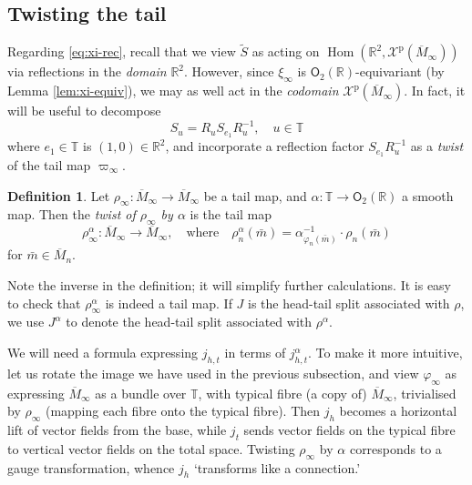 \documentclass{article}
\def\RR{\mathbb{R}}
\def\TT{\mathbb{T}}
\def\XX{\mathscr{X}}
\def\O{\mathsf{O}}
\DeclareMathOperator{\Hom}{\mathrm{Hom}}
\def\p{\mathrm{p}}
\theoremstyle{definition}
\newtheorem{defn}{Definition}
\begin{document}
\subsection{Twisting the tail}
Regarding \eqref{eq:xi-rec}, recall that
we view $\tilde S$ as acting on $\Hom(\RR^2, \XX^\p(\overline M_\infty))$
via reflections in the \emph{domain} $\RR^2$. However, since $\xi_\infty$
is $\O_2(\RR)$-equivariant (by Lemma \ref{lem:xi-equiv}), we may as well
act in the \emph{codomain} $\XX^\p(\overline M_\infty)$. In fact, it will
be useful to decompose
$$ S_u = R_u S_{e_1} R_u^{-1},\quad u \in \TT $$
where $e_1 \in \TT$ is $(1,0) \in \RR^2$, and
incorporate a reflection factor $S_{e_1} R_u^{-1}$ as a \emph{twist}
of the tail map $\varpi_\infty$.
\begin{defn}
Let $\rho_\infty : \overline M_\infty \to \overline M_\infty$ be a tail map,
and $\alpha : \TT \to \O_2(\RR)$ a smooth map. Then the \emph{twist of $\rho_\infty$ by $\alpha$}
is the tail map 
$$\rho^\alpha_\infty : \overline M_\infty \to \overline M_\infty,\quad\textrm{where}\quad
\rho^\alpha_n(\bar m) = \alpha_{\varphi_n(\bar m)}^{-1} \cdot \rho_n(\bar m) $$
for $\bar m \in \overline M_n$.
\end{defn}
Note the inverse in the definition; it will simplify further calculations.
It is easy to check that $\rho^\alpha_\infty$ is indeed a tail map.
If $J$ is the head-tail split associated with $\rho$,
we use $J^\alpha$ to denote the head-tail split
associated with $\rho^\alpha$. 

We will need a formula expressing
$ j_{h,t}$ in terms of $ j^\alpha_{h,t}$.
To make it more intuitive, let us rotate the image we have used in the previous subsection,
and view $\varphi_\infty$ as expressing $\overline M_\infty$ as a bundle over $\TT$,
with typical fibre (a copy of) $\overline M_\infty$, trivialised by $\rho_\infty$ (mapping each fibre
onto the typical fibre). Then $ j_h$ becomes a horizontal lift of vector fields from the base, while $ j_t$
sends vector fields on the typical fibre to vertical vector fields on the total space.
Twisting $\rho_\infty$ by $\alpha$ corresponds to a gauge transformation, whence
$j_h$ `transforms like a connection.'
\end{document}
